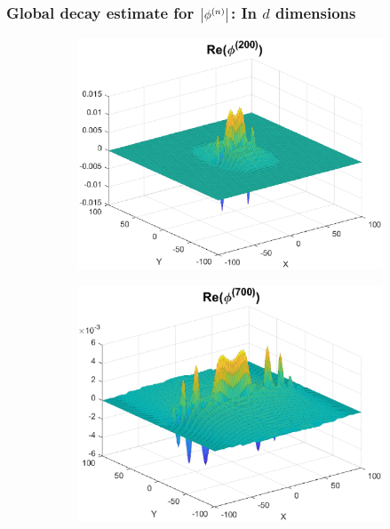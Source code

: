 \documentclass{beamer}
\theoremstyle{definition}
\begin{document}
\begin{frame}
\frametitle{Global decay estimate for $\abs{\phi^{(n)}}$: In $d$ dimensions}



\begin{figure}
\begin{subfigure}{0.495\textwidth}
	\centering
	\includegraphics[width=\textwidth]{Fig10a.eps}
\end{subfigure}
\begin{subfigure}{0.495\textwidth}
	\centering
	\includegraphics[width=\textwidth]{Fig10b.eps}
\end{subfigure}
\end{figure}

\end{frame}
\end{document}
